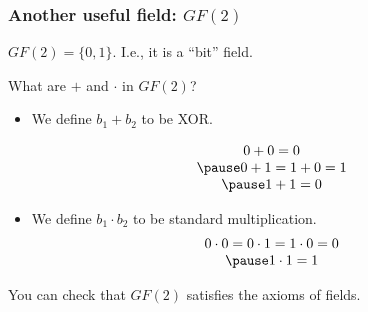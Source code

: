 \begin{frame}
  \frametitle{Another useful field: $GF(2)$}
  $GF(2) = \{0,1\}$.  I.e., it is a ``bit'' field.

  What are $+$ and $\cdot$ in $GF(2)$?

  \pause

  \begin{itemize}
  \item We define $b_1+b_2$ to be XOR.
    \pause

    \[
    \begin{array}{c}
      0 + 0 = 0 \\ \pause
      0 + 1 = 1 + 0 = 1 \\ \pause
      1 + 1 = 0
    \end{array}
    \] \pause
  \item We define $b_1\cdot b_2$ to be standard multiplication.
    \pause
    \[
    \begin{array}{c}
      0 \cdot 0 = 0\cdot 1 = 1\cdot 0 = 0 \\ \pause
      1\cdot 1 = 1
    \end{array}
    \] 
    
  \end{itemize}

  \pause

  You can check that $GF(2)$ satisfies the axioms of fields.
\end{frame}

